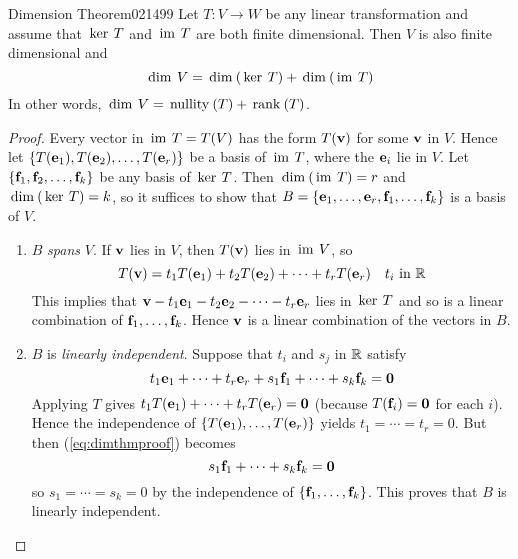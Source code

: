 \begin{theorem}{Dimension Theorem}{021499}
Let $T : V \to W$ be any linear transformation and assume that $\thinspace\operatorname{ker \medspace}T$ and $\thinspace\operatorname{im \medspace}T$ are both finite dimensional. Then $V$ is also finite dimensional and
\begin{equation*}
\thinspace\operatorname{dim \medspace}V = \thinspace\operatorname{dim\medspace}(\thinspace\operatorname{ker \medspace}T) + \thinspace\operatorname{dim\medspace}(\thinspace\operatorname{im \medspace}T)
\end{equation*}
In other words, $\thinspace\operatorname{dim \medspace}V = \thinspace\operatorname{nullity\medspace}(T) + \thinspace\operatorname{rank\medspace}(T)$.
\end{theorem}

\begin{proof}
Every vector in $\thinspace\operatorname{im \medspace}T = T(V)$ has the form $T(\textbf{v})$ for some $\textbf{v}$ in $V$. Hence let $\{T(\textbf{e}_{1}), T(\textbf{e}_{2}), \dots, T(\textbf{e}_{r})\}$ be a basis of $\thinspace\operatorname{im \medspace}T$, where the $\textbf{e}_{i}$ lie in $V$. Let $\{\textbf{f}_{1}, \textbf{f}_{2}, \dots, \textbf{f}_{k}\}$ be any basis of $\thinspace\operatorname{ker \medspace}T$. Then $\thinspace\operatorname{dim\medspace}(\thinspace\operatorname{im \medspace}T) = r$ and $\thinspace\operatorname{dim\medspace}(\thinspace\operatorname{ker \medspace}T) = k$, so it suffices to show that $B = \{\textbf{e}_{1}, \dots, \textbf{e}_{r}, \textbf{f}_{1}, \dots, \textbf{f}_{k}\}$ is a basis of $V$.

\begin{enumerate}
\item $B$ \textit{spans} $V$. If $\textbf{v}$ lies in $V$, then $T(\textbf{v})$ lies in $\thinspace\operatorname{im \medspace}V$, so
\begin{equation*}
T(\textbf{v}) = t_{1}T(\textbf{e}_1) + t_{2}T(\textbf{e}_2) + \cdots + t_{r}T(\textbf{e}_r) \quad t_i \mbox{ in } \mathbb{R}
\end{equation*}
This implies that $\textbf{v} - t_{1}\textbf{e}_{1} - t_{2}\textbf{e}_{2} - \cdots - t_{r}\textbf{e}_{r}$ lies in $\thinspace\operatorname{ker \medspace}T$ and so is a linear combination of $\textbf{f}_{1}, \dots, \textbf{f}_{k}$. Hence $\textbf{v}$ is a linear combination of the vectors in $B$.

\item $B$ is \textit{linearly independent}. Suppose that $t_{i}$ and $s_{j}$ in $\mathbb{R}$ satisfy
\begin{equation}\label{eq:dimthmproof}
t_{1}\textbf{e}_{1} + \cdots + t_{r}\textbf{e}_r + s_{1}\textbf{f}_1 + \cdots + s_{k}\textbf{f}_k = \textbf{0}
\end{equation}
Applying $T$ gives $t_{1}T(\textbf{e}_{1}) + \cdots + t_{r}T(\textbf{e}_{r}) = \textbf{0}$ (because $T(\textbf{f}_{i}) = \textbf{0}$ for each $i$). Hence the independence of $\{T(\textbf{e}_{1}), \dots, T(\textbf{e}_{r})\}$ yields $t_{1} = \cdots = t_{r} = 0$. But then (\ref{eq:dimthmproof}) becomes
\begin{equation*}
s_{1}\textbf{f}_1 + \cdots + s_{k}\textbf{f}_k = \textbf{0}
\end{equation*}
so $s_{1} = \cdots = s_{k} = 0$ by the independence of $\{\textbf{f}_{1}, \dots, \textbf{f}_{k}\}$. This proves that $B$ is linearly independent.
\end{enumerate}
\vspace*{-1em}\end{proof}

